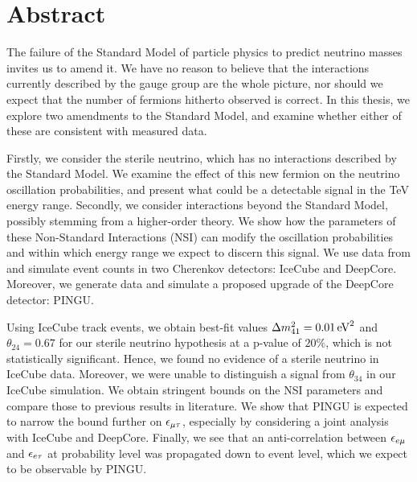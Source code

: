 \chapter*{Abstract}

The failure of the Standard Model of particle physics to predict neutrino masses invites us to amend it. We have no reason to believe that 
the interactions currently described by the gauge group are the whole picture, nor should we expect that the number of fermions hitherto observed is correct.
In this thesis, we explore two amendments to the Standard Model, and examine whether either of these are consistent with measured data.

Firstly, we consider the sterile neutrino, which has no interactions described by the Standard Model. We examine the effect of this 
new fermion on the neutrino oscillation probabilities, and present what could be a detectable signal in the \si{\TeV} energy range.
Secondly, we consider interactions beyond the Standard Model, possibly stemming from a higher-order theory.
We show how the parameters of these Non-Standard Interactions (NSI) can modify the oscillation probabilities and within which energy range we expect to discern this signal.
We use data from and simulate event counts in two Cherenkov detectors: IceCube and DeepCore. Moreover, we generate data and simulate a proposed upgrade of the DeepCore detector: PINGU. 

Using IceCube track events, we obtain best-fit values $\dm[41] = \SI{0.01}{\eV^2}$ and $\theta_{24} = 0.67$ for our sterile neutrino hypothesis at 
a p-value of $20\%$, which is not statistically significant. Hence, we found no evidence of a sterile neutrino in IceCube data. 
Moreover, we were unable to distinguish a signal from $\theta_{34}$ in our IceCube simulation.
We obtain stringent bounds on the NSI parameters and compare those to previous results in literature. We show that PINGU is expected to narrow the bound further 
on $\epsilon_{\mu\tau}$, especially by considering a joint analysis with IceCube and DeepCore. Finally, we see that an anti-correlation between 
$\epsilon_{e\mu}$ and $\epsilon_{e\tau}$ at probability level was propagated down to event level, which we expect to be observable by PINGU.

